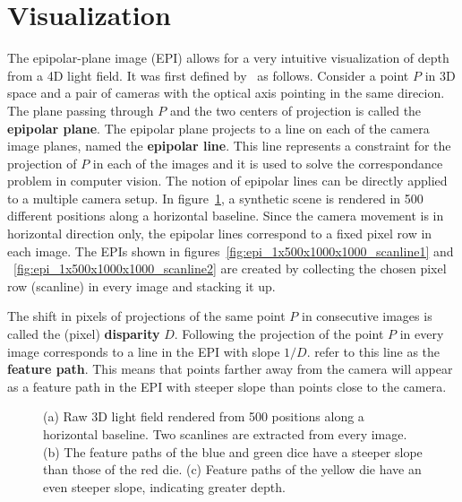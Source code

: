 \section{Visualization}

The epipolar-plane image (EPI) allows for a very intuitive visualization of depth from a 4D light field.
It was first defined by~\cite{EPI} as follows.
Consider a point $P$ in 3D space and a pair of cameras with the optical axis pointing in the same direcion.
The plane passing through $P$ and the two centers of projection is called the \textbf{epipolar plane}.
The epipolar plane projects to a line on each of the camera image planes, named the \textbf{epipolar line}.
This line represents a constraint for the projection of $P$ in each of the images and it is used to solve the correspondance problem in computer vision.
The notion of epipolar lines can be directly applied to a multiple camera setup.
In figure~\ref{fig:epi_example_perspective}, a synthetic scene is rendered in 500 different positions along a horizontal baseline.
Since the camera movement is in horizontal direction only, the epipolar lines correspond to a fixed pixel row in each image.
The EPIs shown in figures~\ref{fig:epi_1x500x1000x1000_scanline1} and ~\ref{fig:epi_1x500x1000x1000_scanline2} are created by collecting the chosen pixel row (scanline) in every image and stacking it up.

The shift in pixels of projections of the same point $P$ in consecutive images is called the (pixel) \textbf{disparity} $D$.
Following the projection of the point $P$ in every image corresponds to a line in the EPI with slope $1 / D$.
\cite{EPI} refer to this line as the \textbf{feature path}.
This means that points farther away from the camera will appear as a feature path in the EPI with steeper slope than points close to the camera.

\begin{figure}[tb]
	\subfigure[]{
		\centering
		
		\label{fig:epi_1x500x1000x1000_overview}
	}
	\hfill
	\subfigure[]{
		\centering
		
		\label{fig:epi_1x500x1000x1000_scanline1}
	}
	\hfill
	\subfigure[]{
		\centering
		
		\label{fig:epi_1x500x1000x1000_scanline2}
	}
	\caption{(a) Raw 3D light field rendered from 500 positions along a horizontal baseline.
				 Two scanlines are extracted from every image. 
			 (b) The feature paths of the blue and green dice have a steeper slope than those of the red die.
			 (c) Feature paths of the yellow die have an even steeper slope, indicating greater depth.}
	\label{fig:epi_example_perspective}
\end{figure}




